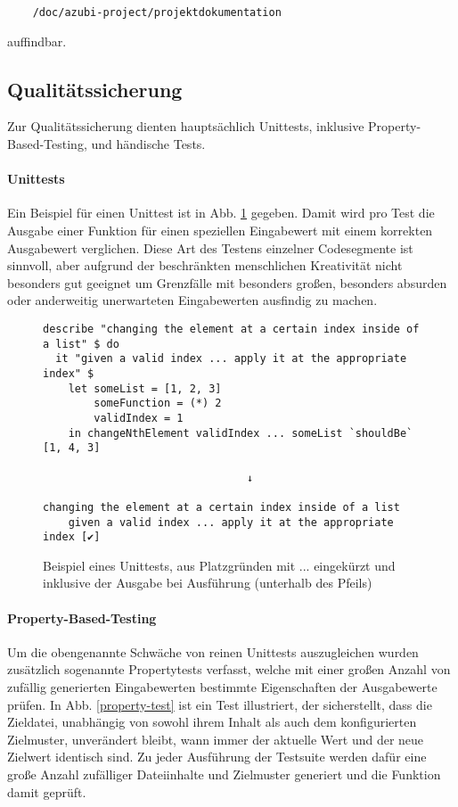 \begin{verbatim}
    /doc/azubi-project/projektdokumentation
\end{verbatim}

auffindbar.

\subsection{Qualitätssicherung}
Zur Qualitätssicherung dienten hauptsächlich Unittests, inklusive \gls{Property-Based-Testing},
und händische Tests.

\paragraph{Unittests}
Ein Beispiel für einen Unittest ist in Abb. \ref{unit-test} gegeben. Damit wird
pro Test die Ausgabe einer Funktion für einen speziellen Eingabewert mit einem
korrekten Ausgabewert verglichen. Diese Art des Testens einzelner Codesegmente ist
sinnvoll, aber aufgrund der beschränkten menschlichen Kreativität nicht besonders
gut geeignet um Grenzfälle mit besonders großen, besonders absurden oder anderweitig
unerwarteten Eingabewerten ausfindig zu machen.

\begin{figure}
    \caption{Beispiel eines Unittests, aus Platzgründen mit ... eingekürzt und inklusive
        der Ausgabe bei Ausführung (unterhalb des Pfeils)}
    \label{unit-test}
    \begin{verbatim}
describe "changing the element at a certain index inside of a list" $ do
  it "given a valid index ... apply it at the appropriate index" $
    let someList = [1, 2, 3]
        someFunction = (*) 2
        validIndex = 1
    in changeNthElement validIndex ... someList `shouldBe` [1, 4, 3]

                                ↓

changing the element at a certain index inside of a list
    given a valid index ... apply it at the appropriate index [✔]
    \end{verbatim}
\end{figure}

\paragraph{\gls{Property-Based-Testing}}
Um die obengenannte Schwäche von reinen Unittests auszugleichen wurden zusätzlich
sogenannte Propertytests verfasst, welche mit einer großen Anzahl von zufällig generierten
Eingabewerten bestimmte Eigenschaften der Ausgabewerte prüfen. In Abb. \ref{property-test}
ist ein Test illustriert, der sicherstellt, dass die Zieldatei, unabhängig von
sowohl ihrem Inhalt als auch dem konfigurierten \gls{Zielmuster}, unverändert
bleibt, wann immer der aktuelle Wert und der neue Zielwert identisch sind. Zu
jeder Ausführung der Testsuite werden dafür eine große Anzahl zufälliger Dateiinhalte
und Zielmuster generiert und die Funktion damit geprüft.

